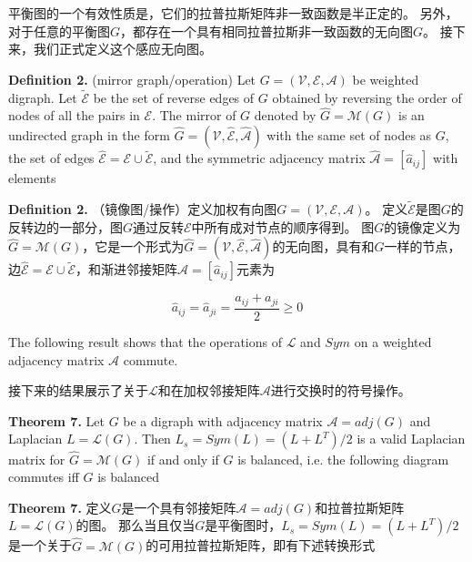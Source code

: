 \documentclass{article}
\begin{document}
平衡图的一个有效性质是，它们的拉普拉斯矩阵非一致函数是半正定的。
另外，对于任意的平衡图$G$，都存在一个具有相同拉普拉斯非一致函数的无向图$G$。
接下来，我们正式定义这个感应无向图。

{\color[gray]{0.5}
\noindent \textbf{Definition 2.} (mirror graph/operation) Let $G=(\mathcal{V}, \mathcal{E}, \mathcal{A})$ be weighted digraph. 
Let $\tilde{\mathcal{E}}$ be the set of reverse edges of $G$ obtained by reversing the order of nodes of all the pairs in $\mathcal{E}$. 
The mirror of $G$ denoted by $\hat{G}=\mathcal{M}(G)$ is an undirected graph in the form $\hat{G}=(\mathcal{V}, \hat{\mathcal{E}}, \hat{\mathcal{A}})$ with the same set of nodes as $G$, the set of edges $\hat{\mathcal{E}}=\mathcal{E}\cup \tilde{\mathcal{E}}$, and the symmetric adjacency matrix $\hat{\mathcal{A}}=[\hat{a}_{ij}]$ with elements
}

\noindent \textbf{Definition 2.} （镜像图/操作）定义加权有向图$G=(\mathcal{V}, \mathcal{E}, \mathcal{A})$。
定义$\tilde{\mathcal{E}}$是图$G$的反转边的一部分，图$G$通过反转$\mathcal{E}$中所有成对节点的顺序得到。
图$G$的镜像定义为$\hat{G}=\mathcal{M}(G)$，它是一个形式为$\hat{G}=(\mathcal{V}, \hat{\mathcal{E}}, \hat{\mathcal{A}})$的无向图，具有和$G$一样的节点，边$\hat{\mathcal{E}}=\mathcal{E}\cup \tilde{\mathcal{E}}$，和渐进邻接矩阵$\hat{\mathcal{A}}=[\hat{a}_{ij}]$元素为

\begin{equation}
    \hat{a}_{ij}=\hat{a}_{ji}=\frac{a_{ij}+a_{ji}}{2}\ge 0
    \tag{25}
    \label{25}
\end{equation}

{\color[gray]{0.5}
The following result shows that the operations of $\mathcal{L}$ and $Sym$ on a weighted adjacency matrix $\mathcal{A}$ commute.
}

接下来的结果展示了关于$\mathcal{L}$和在加权邻接矩阵$\mathcal{A}$进行交换时的符号操作。

{\color[gray]{0.5}
\noindent \textbf{Theorem 7.} Let $G$ be a digraph with adjacency matrix $\mathcal{A}=adj(G)$ and Laplacian $L=\mathcal{L}(G)$. 
Then $L_s = Sym(L) = (L+L^T)/2$ is a valid Laplacian matrix for $\hat{G}=\mathcal{M}(G)$ if and only if $G$ is balanced, i.e. the following diagram commutes iﬀ $G$ is balanced
}

\noindent \textbf{Theorem 7.} 定义$G$是一个具有邻接矩阵$\mathcal{A}=adj(G)$和拉普拉斯矩阵$L=\mathcal{L}(G)$的图。
那么当且仅当$G$是平衡图时，$L_s = Sym(L) = (L+L^T)/2$是一个关于$\hat{G}=\mathcal{M}(G)$的可用拉普拉斯矩阵，即有下述转换形式
\end{document}
